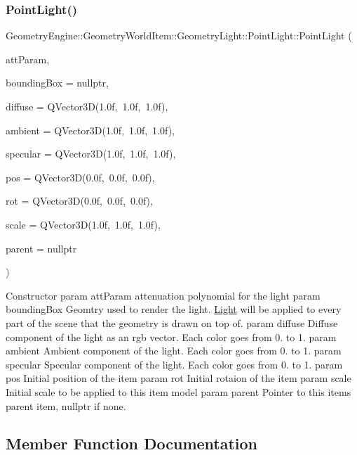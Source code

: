 \subsubsection{\texorpdfstring{PointLight()}{PointLight()}}
{\footnotesize\ttfamily Geometry\+Engine\+::\+Geometry\+World\+Item\+::\+Geometry\+Light\+::\+Point\+Light\+::\+Point\+Light (\begin{DoxyParamCaption}\item[{const Q\+Vector3D \&}]{att\+Param,  }\item[{\mbox{\hyperlink{class_geometry_engine_1_1_geometry_world_item_1_1_geometry_item_1_1_geometry_item}{Geometry\+Item\+::\+Geometry\+Item}} $\ast$}]{bounding\+Box = {\ttfamily nullptr},  }\item[{const Q\+Vector3D \&}]{diffuse = {\ttfamily QVector3D(1.0f,~1.0f,~1.0f)},  }\item[{const Q\+Vector3D \&}]{ambient = {\ttfamily QVector3D(1.0f,~1.0f,~1.0f)},  }\item[{const Q\+Vector3D \&}]{specular = {\ttfamily QVector3D(1.0f,~1.0f,~1.0f)},  }\item[{const Q\+Vector3D \&}]{pos = {\ttfamily QVector3D(0.0f,~0.0f,~0.0f)},  }\item[{const Q\+Vector3D \&}]{rot = {\ttfamily QVector3D(0.0f,~0.0f,~0.0f)},  }\item[{const Q\+Vector3D \&}]{scale = {\ttfamily QVector3D(1.0f,~1.0f,~1.0f)},  }\item[{\mbox{\hyperlink{class_geometry_engine_1_1_geometry_world_item_1_1_world_item}{World\+Item}} $\ast$}]{parent = {\ttfamily nullptr} }\end{DoxyParamCaption})}

Constructor param att\+Param attenuation polynomial for the light param bounding\+Box Geomtry used to render the light. \mbox{\hyperlink{class_geometry_engine_1_1_geometry_world_item_1_1_geometry_light_1_1_light}{Light}} will be applied to every part of the scene that the geometry is drawn on top of. param diffuse Diffuse component of the light as an rgb vector. Each color goes from 0. to 1. param ambient Ambient component of the light. Each color goes from 0. to 1. param specular Specular component of the light. Each color goes from 0. to 1. param pos Initial position of the item param rot Initial rotaion of the item param scale Initial scale to be applied to this item model param parent Pointer to this items parent item, nullptr if none. 

\subsection{Member Function Documentation}
\mbox{\label{class_geometry_engine_1_1_geometry_world_item_1_1_geometry_light_1_1_point_light_aa30244fd20e61fdfe1ac1d85c99fd154}} 

